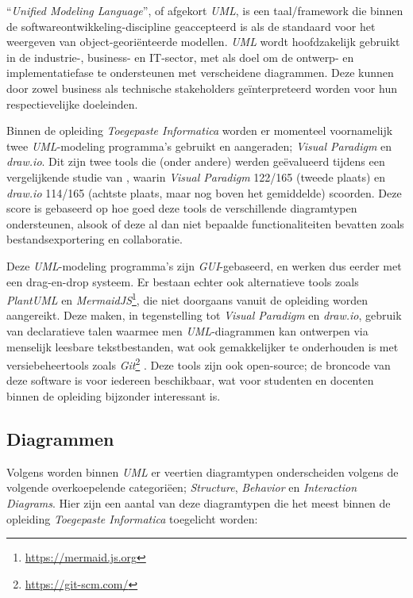 ``\emph{Unified Modeling Language}'', of afgekort \emph{UML}, is een taal/framework die binnen de softwareontwikkeling-discipline geaccepteerd is als de standaard voor het weergeven van object-georiënteerde modellen. \emph{UML} wordt hoofdzakelijk gebruikt in de industrie-, business- en IT-sector, met als doel om de ontwerp- en implementatiefase te ondersteunen met verscheidene diagrammen. Deze kunnen door zowel business als technische stakeholders geïnterpreteerd worden voor hun respectievelijke doeleinden. \autocite{Koc2021}

Binnen de opleiding \emph{Toegepaste Informatica} worden er momenteel voornamelijk twee \emph{UML}-modeling programma's gebruikt en aangeraden; \emph{Visual Paradigm} en \emph{draw.io}. Dit zijn twee tools die (onder andere) werden geëvalueerd tijdens een vergelijkende studie van \textcite{Lu2023}, waarin \emph{Visual Paradigm} 122/165 (tweede plaats) en \emph{draw.io} 114/165 (achtste plaats, maar nog boven het gemiddelde) scoorden. Deze score is gebaseerd op hoe goed deze tools de verschillende diagramtypen ondersteunen, alsook of deze al dan niet bepaalde functionaliteiten bevatten zoals bestandsexportering en collaboratie.

Deze \emph{UML}-modeling programma's zijn \emph{GUI}-gebaseerd, en werken dus eerder met een drag-en-drop systeem. Er bestaan echter ook alternatieve tools zoals \emph{PlantUML} en \emph{MermaidJS}\footnote{\url{https://mermaid.js.org}}, die niet doorgaans vanuit de opleiding worden aangereikt. Deze maken, in tegenstelling tot \emph{Visual Paradigm} en \emph{draw.io}, gebruik van declaratieve talen waarmee men \emph{UML}-diagrammen kan ontwerpen via menselijk leesbare tekstbestanden, wat ook gemakkelijker te onderhouden is met versiebeheertools zoals \emph{Git}\footnote{\url{https://git-scm.com/}} \autocite{Romeo2025}.
Deze tools zijn ook open-source; de broncode van deze software is voor iedereen beschikbaar, wat voor studenten en docenten binnen de opleiding bijzonder interessant is.

\subsection{Diagrammen}%

Volgens \textcite{Padmanabhan2012} worden binnen \emph{UML} er veertien diagramtypen onderscheiden volgens de volgende overkoepelende categoriëen; \emph{Structure}, \emph{Behavior} en \emph{Interaction Diagrams}. Hier zijn een aantal van deze diagramtypen die het meest binnen de opleiding \emph{Toegepaste Informatica} toegelicht worden:

